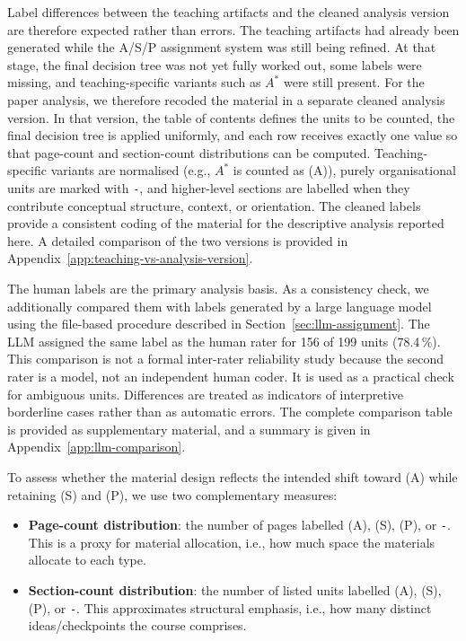 \documentclass{article}
\begin{document}
Label differences between the teaching artifacts and the cleaned analysis version are therefore expected rather than errors. The teaching artifacts had already been generated while the A/S/P assignment system was still being refined. At that stage, the final decision tree was not yet fully worked out, some labels were missing, and teaching-specific variants such as \(A^*\) were still present. 
For the paper analysis, we therefore recoded the material in a separate cleaned analysis version. In that version, the table of contents defines the units to be counted, the final decision tree is applied uniformly, and each row receives exactly one value so that page-count and section-count distributions can be computed. 
Teaching-specific variants are normalised (e.g., \(A^*\) is counted as (A)), purely organisational units are marked with \texttt{-}, and higher-level sections are labelled when they contribute conceptual structure, context, or orientation. 
The cleaned labels provide a consistent coding of the material for the descriptive analysis reported here. 
A detailed comparison of the two versions is provided in Appendix~\ref{app:teaching-vs-analysis-version}.\par

The human labels are the primary analysis basis. As a consistency check, we additionally compared them with labels generated by a large language model using the file-based procedure described in Section~\ref{sec:llm-assignment}. The LLM assigned the same label as the human rater for 156 of 199 units (78.4\,\%). This comparison is not a formal inter-rater reliability study because the second rater is a model, not an independent human coder. It is used as a practical check for ambiguous units. Differences are treated as indicators of interpretive borderline cases rather than as automatic errors. The complete comparison table is provided as supplementary material, and a summary is given in Appendix~\ref{app:llm-comparison}.\par

To assess whether the material design reflects the intended shift toward (A) while retaining (S) and (P), we use two complementary measures:
\begin{itemize}[leftmargin=*]
  \item \textbf{Page-count distribution}: the number of pages labelled (A), (S), (P), or \texttt{-}. This is a proxy for material allocation, i.e., how much space the materials allocate to each type.
  \item \textbf{Section-count distribution}: the number of listed units labelled (A), (S), (P), or \texttt{-}. This approximates structural emphasis, i.e., how many distinct ideas/checkpoints the course comprises.
\end{itemize}
\vspace{-1mm}
\end{document}
